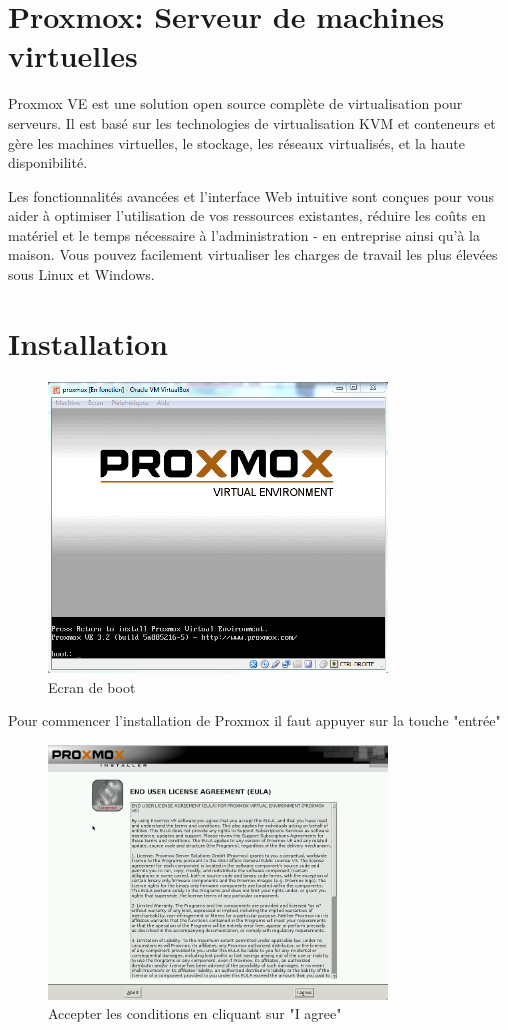 \documentclass[12pt,a4paper]{article}
\begin{document}
\newpage
\section{Proxmox: Serveur de machines virtuelles}

Proxmox VE est une solution open source complète de virtualisation pour serveurs. Il est basé sur les technologies de virtualisation KVM et conteneurs et gère les machines virtuelles, le stockage, les réseaux virtualisés, et la haute disponibilité.

Les fonctionnalités avancées et l'interface Web intuitive sont conçues pour vous aider à optimiser l'utilisation de vos ressources existantes, réduire les coûts en matériel et le temps nécessaire à l'administration - en entreprise ainsi qu'à la maison. Vous pouvez facilement virtualiser les charges de travail les plus élevées sous Linux et Windows.
\newpage
\section{Installation}

\begin{figure}[!ht]
\center
\includegraphics[width=9cm]{Images/1.PNG} 
\caption{Ecran de boot}
\end{figure}

\begin{center}
Pour commencer l'installation de Proxmox il faut appuyer sur la touche "entrée"
\end{center}

\begin{figure}[!ht]
\center
\includegraphics[width=9cm]{Images/2.PNG} 
\caption{Accepter les conditions en cliquant sur "I agree"}
\end{figure}
\end{document}
